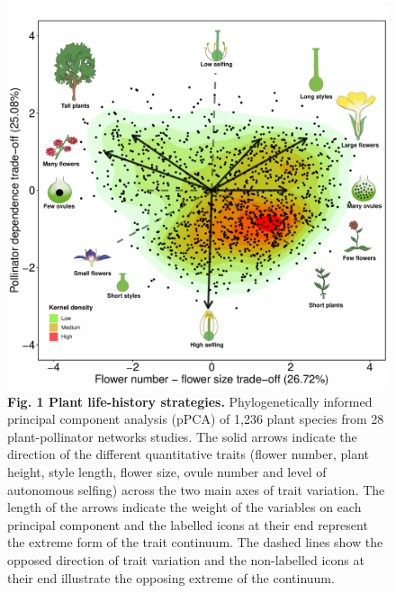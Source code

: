 \documentclass[12pt,a4paper,]{article}
\begin{document}
\begin{figure}
\centering
\includegraphics{output/figures/unnamed-chunk-1-1.pdf}
\caption{\label{fig:unnamed-chunk-1}\textbf{Fig. 1 \textbar{} Plant
life-history strategies.} Phylogenetically informed principal component
analysis (pPCA) of 1,236 plant species from 28 plant-pollinator networks
studies. The solid arrows indicate the direction of the different
quantitative traits (flower number, plant height, style length, flower
size, ovule number and level of autonomous selfing) across the two main
axes of trait variation. The length of the arrows indicate the weight of
the variables on each principal component and the labelled icons at
their end represent the extreme form of the trait continuum. The dashed
lines show the opposed direction of trait variation and the non-labelled
icons at their end illustrate the opposing extreme of the continuum.}
\end{figure}
\end{document}
